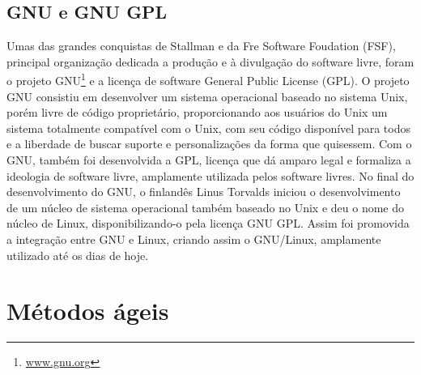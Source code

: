 \subsection{GNU e GNU GPL}

Umas das grandes conquistas de Stallman e da Fre Software Foudation (FSF), 
principal organização dedicada a produção e à divulgação do software livre, 
foram o projeto GNU\footnote{\url{www.gnu.org}} e a licença de software General Public License (GPL).
%
O projeto GNU consistiu em desenvolver um sistema operacional baseado no sistema 
Unix, porém livre de código proprietário, proporcionando aos usuários do Unix um 
sistema totalmente compatível com o Unix, com seu código disponível para todos e 
a liberdade de buscar suporte e personalizações da forma que quisessem.
%
Com o GNU, também foi desenvolvida a GPL, licença que dá amparo legal e formaliza 
a ideologia de software livre, amplamente utilizada pelos software livres.
%
No final do desenvolvimento do GNU, o finlandês Linus Torvalds iniciou o 
desenvolvimento de um núcleo de sistema operacional também baseado no Unix e 
deu o nome do núcleo de Linux, disponibilizando-o pela licença GNU GPL. Assim 
foi promovida a integração entre GNU e Linux, criando assim o GNU/Linux, amplamente 
utilizado até os dias de hoje.


\section{Métodos ágeis}
\label{metodos-ageis}

